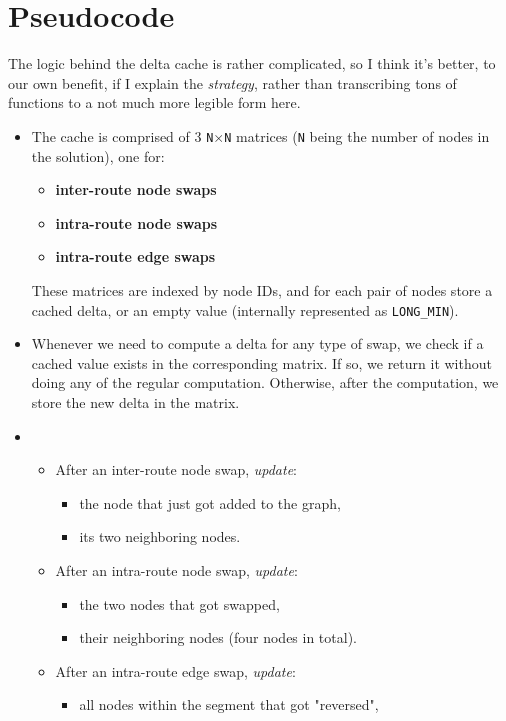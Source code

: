 \documentclass[14pt]{article}
\begin{document}
\section{Pseudocode}
The logic behind the delta cache is rather complicated, so I think it's better,
to our own benefit, if I explain the \emph{strategy}, rather than transcribing
tons of functions to a not much more legible form here.

\begin{itemize}
	\item The cache is comprised of 3 \verb`N`$\times$\verb`N` matrices (\verb`N`
		being the number of nodes in the solution), one for:
		\begin{itemize}
			\item \textbf{inter-route node swaps}
			\item \textbf{intra-route node swaps}
			\item \textbf{intra-route edge swaps}
		\end{itemize}
		These matrices are indexed by node IDs, and for each pair of nodes
		store a cached delta, or an empty value (internally represented as
		\verb`LONG_MIN`).
	\item Whenever we need to compute a delta for any type of swap, we check if
		a cached value exists in the corresponding matrix. If so, we return it
		without doing any of the regular computation. Otherwise, after the
		computation, we store the new delta in the matrix.
	\item[]
		\begin{itemize}
			\item After an inter-route node swap, \emph{update}:
				\begin{itemize}
					\item the node that just got added to the graph,
					\item its two neighboring nodes.
				\end{itemize}
			\item After an intra-route node swap, \emph{update}:
				\begin{itemize}
					\item the two nodes that got swapped,
					\item their neighboring nodes (four nodes in total).
				\end{itemize}
			\item After an intra-route edge swap, \emph{update}:
				\begin{itemize}
					\item all nodes within the segment that got "reversed",

\end{itemize}
\end{itemize}
\end{itemize}
\end{document}
